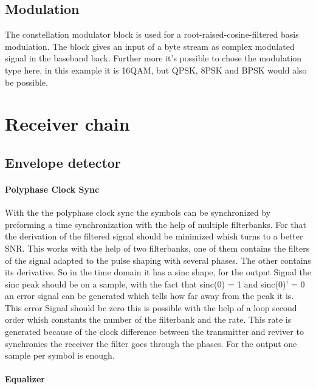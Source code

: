 \subsection{Modulation}

The constellation modulator block is used for a root-raised-cosine-filtered basis modulation. The block gives an input of a byte stream as complex modulated signal in the baseband back. 
Further more it's possible to chose the modulation type here, in this example it is 16QAM, but QPSK, 8PSK and BPSK would also be possible.

\section{Receiver chain}

\subsection{Envelope detector}

\paragraph{Polyphase Clock Sync}
With the the polyphase clock sync the symbols can be synchronized by preforming a time synchronization with the help of multiple filterbanks. For that the derivation of the filtered signal should be minimized whish turns to a better SNR. This works with the help of two filterbanks, one of them contains the filters of the signal adapted to the pulse shaping with several phases. The other contains its derivative. So in the time domain it has a sinc shape, for the output Signal the sinc peak should be on a sample, with the fact that sinc(0) = 1 and sinc(0)' = 0 an error signal can be generated which tells how far away from the peak it is. This error Signal should be zero this is possible with the help of a loop second order whish constants the number of the filterbank and the rate. This rate is generated because of the clock difference between the transmitter and reviver to synchronies the receiver the filter goes through the phases. For the output one sample per symbol is enough.

\paragraph{Equalizer}

